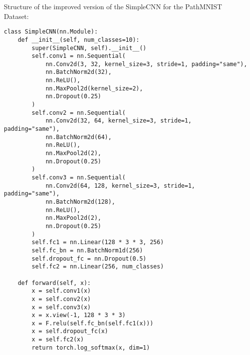 Structure of the improved version of the SimpleCNN for the PathMNIST Dataset:\@

\begin{verbatim}
class SimpleCNN(nn.Module):
    def __init__(self, num_classes=10):
        super(SimpleCNN, self).__init__()
        self.conv1 = nn.Sequential(
            nn.Conv2d(3, 32, kernel_size=3, stride=1, padding="same"),
            nn.BatchNorm2d(32),
            nn.ReLU(),
            nn.MaxPool2d(kernel_size=2),
            nn.Dropout(0.25)
        )
        self.conv2 = nn.Sequential(
            nn.Conv2d(32, 64, kernel_size=3, stride=1, padding="same"),
            nn.BatchNorm2d(64),
            nn.ReLU(),
            nn.MaxPool2d(2),
            nn.Dropout(0.25)
        )
        self.conv3 = nn.Sequential(
            nn.Conv2d(64, 128, kernel_size=3, stride=1, padding="same"),
            nn.BatchNorm2d(128),
            nn.ReLU(),
            nn.MaxPool2d(2),
            nn.Dropout(0.25)
        )
        self.fc1 = nn.Linear(128 * 3 * 3, 256)
        self.fc_bn = nn.BatchNorm1d(256)
        self.dropout_fc = nn.Dropout(0.5)
        self.fc2 = nn.Linear(256, num_classes)

    def forward(self, x):
        x = self.conv1(x)
        x = self.conv2(x)
        x = self.conv3(x)
        x = x.view(-1, 128 * 3 * 3)
        x = F.relu(self.fc_bn(self.fc1(x)))
        x = self.dropout_fc(x)
        x = self.fc2(x)
        return torch.log_softmax(x, dim=1)
\end{verbatim}
